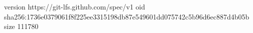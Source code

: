 version https://git-lfs.github.com/spec/v1
oid sha256:1736e0379061f8f225ee3315198db87e549601dd075742c5b96d6ec887d4b05b
size 111780
